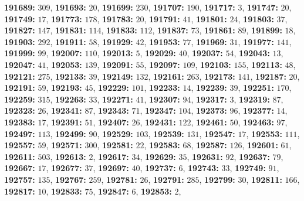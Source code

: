 \textsf{\bfseries 191689:} $309$, \textsf{\bfseries 191693:} $20$, \textsf{\bfseries 191699:} $230$, \textsf{\bfseries 191707:} $190$, \textsf{\bfseries 191717:} $3$, \textsf{\bfseries 191747:} $20$, \textsf{\bfseries 191749:} $17$, \textsf{\bfseries 191773:} $178$, \textsf{\bfseries 191783:} $20$, \textsf{\bfseries 191791:} $41$, \textsf{\bfseries 191801:} $24$, \textsf{\bfseries 191803:} $37$, \textsf{\bfseries 191827:} $147$, \textsf{\bfseries 191831:} $114$, \textsf{\bfseries 191833:} $112$, \textsf{\bfseries 191837:} $73$, \textsf{\bfseries 191861:} $89$, \textsf{\bfseries 191899:} $18$, \textsf{\bfseries 191903:} $292$, \textsf{\bfseries 191911:} $58$, \textsf{\bfseries 191929:} $42$, \textsf{\bfseries 191953:} $77$, \textsf{\bfseries 191969:} $31$, \textsf{\bfseries 191977:} $141$, \textsf{\bfseries 191999:} $99$, \textsf{\bfseries 192007:} $110$, \textsf{\bfseries 192013:} $5$, \textsf{\bfseries 192029:} $40$, \textsf{\bfseries 192037:} $54$, \textsf{\bfseries 192043:} $13$, \textsf{\bfseries 192047:} $41$, \textsf{\bfseries 192053:} $139$, \textsf{\bfseries 192091:} $55$, \textsf{\bfseries 192097:} $109$, \textsf{\bfseries 192103:} $155$, \textsf{\bfseries 192113:} $48$, \textsf{\bfseries 192121:} $275$, \textsf{\bfseries 192133:} $39$, \textsf{\bfseries 192149:} $132$, \textsf{\bfseries 192161:} $263$, \textsf{\bfseries 192173:} $141$, \textsf{\bfseries 192187:} $20$, \textsf{\bfseries 192191:} $59$, \textsf{\bfseries 192193:} $45$, \textsf{\bfseries 192229:} $101$, \textsf{\bfseries 192233:} $14$, \textsf{\bfseries 192239:} $39$, \textsf{\bfseries 192251:} $170$, \textsf{\bfseries 192259:} $315$, \textsf{\bfseries 192263:} $33$, \textsf{\bfseries 192271:} $41$, \textsf{\bfseries 192307:} $94$, \textsf{\bfseries 192317:} $3$, \textsf{\bfseries 192319:} $87$, \textsf{\bfseries 192323:} $26$, \textsf{\bfseries 192341:} $87$, \textsf{\bfseries 192343:} $71$, \textsf{\bfseries 192347:} $104$, \textsf{\bfseries 192373:} $96$, \textsf{\bfseries 192377:} $14$, \textsf{\bfseries 192383:} $17$, \textsf{\bfseries 192391:} $51$, \textsf{\bfseries 192407:} $26$, \textsf{\bfseries 192431:} $122$, \textsf{\bfseries 192461:} $50$, \textsf{\bfseries 192463:} $97$, \textsf{\bfseries 192497:} $113$, \textsf{\bfseries 192499:} $90$, \textsf{\bfseries 192529:} $103$, \textsf{\bfseries 192539:} $131$, \textsf{\bfseries 192547:} $17$, \textsf{\bfseries 192553:} $111$, \textsf{\bfseries 192557:} $59$, \textsf{\bfseries 192571:} $300$, \textsf{\bfseries 192581:} $22$, \textsf{\bfseries 192583:} $68$, \textsf{\bfseries 192587:} $126$, \textsf{\bfseries 192601:} $61$, \textsf{\bfseries 192611:} $503$, \textsf{\bfseries 192613:} $2$, \textsf{\bfseries 192617:} $34$, \textsf{\bfseries 192629:} $35$, \textsf{\bfseries 192631:} $92$, \textsf{\bfseries 192637:} $79$, \textsf{\bfseries 192667:} $17$, \textsf{\bfseries 192677:} $37$, \textsf{\bfseries 192697:} $40$, \textsf{\bfseries 192737:} $6$, \textsf{\bfseries 192743:} $33$, \textsf{\bfseries 192749:} $91$, \textsf{\bfseries 192757:} $135$, \textsf{\bfseries 192767:} $259$, \textsf{\bfseries 192781:} $26$, \textsf{\bfseries 192791:} $285$, \textsf{\bfseries 192799:} $30$, \textsf{\bfseries 192811:} $166$, \textsf{\bfseries 192817:} $10$, \textsf{\bfseries 192833:} $75$, \textsf{\bfseries 192847:} $6$, \textsf{\bfseries 192853:} $2$, 
